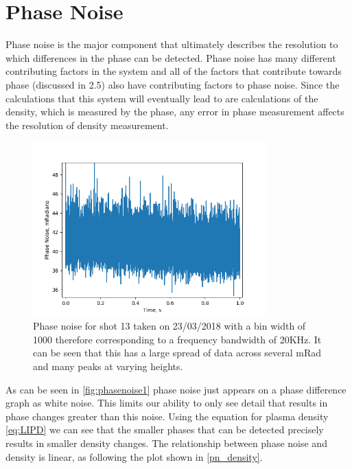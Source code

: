 \documentclass[12pt,a4paper,oneside]{report}
\begin{document}
\section{Phase Noise}
Phase noise is the major component that ultimately describes the resolution to which differences in the phase can be detected. Phase noise has many different contributing factors in the system and all of the factors that contribute towards phase (discussed in 2.5) also have contributing factors to phase noise. Since the calculations that this system will eventually lead to are calculations of the density, which is measured by the phase, any error in phase measurement affects the resolution of density measurement.

\begin{figure}[H]
\includegraphics[width=0.8\textwidth, center,angle=0]{DImages/Phase_Noise_for_Scene_shot_13_with_bandwidth___1000_Date_20180323.png}
\caption{Phase noise for shot 13 taken on 23/03/2018 with a bin width of 1000 therefore corresponding to a frequency bandwidth of 20KHz. It can be seen that this has a large spread of data across several mRad and many peaks at varying heights.}
\label{fig:phasenoise1}
\end{figure}
As can be seen in \autoref{fig:phasenoise1} phase noise just appears on a phase difference graph as white noise. This limits our ability to only see detail that results in phase changes greater than this noise. Using the equation for plasma density \autoref{eq:LIPD} we can see that the smaller phases that can be detected precisely results in smaller density changes. The relationship between phase noise and density is linear, as following the plot shown in \autoref{pn_density}.
\end{document}
